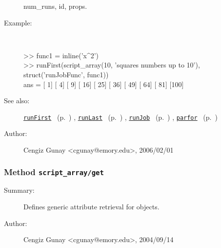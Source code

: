 \begin{description}
	num\_runs, id, props.
%
\item[Example:]~
\begin{lyxcode} >> func1 = inline('x\textasciicircum{}2')
\\%
 >> runFirst(script\_array(10, 'squares numbers up to 10'), struct('runJobFunc', func1))
\\%
 ans = [  1]    [  4]    [  9]    [ 16]    [ 25]    [ 36]    [ 49]    [ 64]    [ 81]    [100]
\\%
\end{lyxcode}
%
\item[See also:]%
\hyperlink{ref_runFirst}{\texttt{runFirst}}%
\ (p.~\pageref{ref_runFirst})%
%
, \hyperlink{ref_runLast}{\texttt{runLast}}%
\ (p.~\pageref{ref_runLast})%
%
, \hyperlink{ref_runJob}{\texttt{runJob}}%
\ (p.~\pageref{ref_runJob})%
%
, \hyperlink{ref_parfor}{\texttt{parfor}}%
\ (p.~\pageref{ref_parfor})%
%
%
\item[Author:]%
Cengiz Gunay <cgunay@emory.edu>, 2006/02/01
%
\end{description}
\methodline%
\subsubsection[Method \texttt{get}]{Method \texttt{script\_array/get}}%
%
\label{ref_script_array__get}%
\hypertarget{ref_script_array__get}{}%
\begin{description}
\item[Summary:]Defines generic attribute retrieval for objects.
%
%
%
%
%
%
%
\item[Author:]%
Cengiz Gunay <cgunay@emory.edu>, 2004/09/14
%
\end{description}
\methodline%
